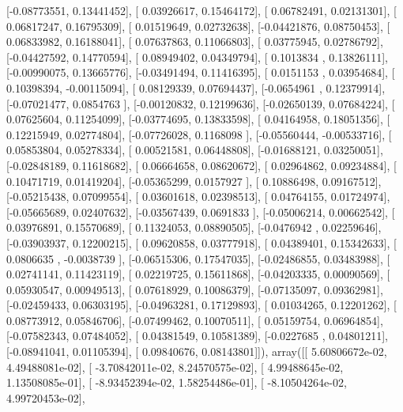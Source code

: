 \documentclass{article}
\begin{document}
       [-0.08773551,  0.13441452],
       [ 0.03926617,  0.15464172],
       [ 0.06782491,  0.02131301],
       [ 0.06817247,  0.16795309],
       [ 0.01519649,  0.02732638],
       [-0.04421876,  0.08750453],
       [ 0.06833982,  0.16188041],
       [ 0.07637863,  0.11066803],
       [ 0.03775945,  0.02786792],
       [-0.04427592,  0.14770594],
       [ 0.08949402,  0.04349794],
       [ 0.1013834 ,  0.13826111],
       [-0.00990075,  0.13665776],
       [-0.03491494,  0.11416395],
       [ 0.0151153 ,  0.03954684],
       [ 0.10398394, -0.00115094],
       [ 0.08129339,  0.07694437],
       [-0.0654961 ,  0.12379914],
       [-0.07021477,  0.0854763 ],
       [-0.00120832,  0.12199636],
       [-0.02650139,  0.07684224],
       [ 0.07625604,  0.11254099],
       [-0.03774695,  0.13833598],
       [ 0.04164958,  0.18051356],
       [ 0.12215949,  0.02774804],
       [-0.07726028,  0.1168098 ],
       [-0.05560444, -0.00533716],
       [ 0.05853804,  0.05278334],
       [ 0.00521581,  0.06448808],
       [-0.01688121,  0.03250051],
       [-0.02848189,  0.11618682],
       [ 0.06664658,  0.08620672],
       [ 0.02964862,  0.09234884],
       [ 0.10471719,  0.01419204],
       [-0.05365299,  0.0157927 ],
       [ 0.10886498,  0.09167512],
       [-0.05215438,  0.07099554],
       [ 0.03601618,  0.02398513],
       [ 0.04764155,  0.01724974],
       [-0.05665689,  0.02407632],
       [-0.03567439,  0.0691833 ],
       [-0.05006214,  0.00662542],
       [ 0.03976891,  0.15570689],
       [ 0.11324053,  0.08890505],
       [-0.0476942 ,  0.02259646],
       [-0.03903937,  0.12200215],
       [ 0.09620858,  0.03777918],
       [ 0.04389401,  0.15342633],
       [ 0.0806635 , -0.0038739 ],
       [-0.06515306,  0.17547035],
       [-0.02486855,  0.03483988],
       [ 0.02741141,  0.11423119],
       [ 0.02219725,  0.15611868],
       [-0.04203335,  0.00090569],
       [ 0.05930547,  0.00949513],
       [ 0.07618929,  0.10086379],
       [-0.07135097,  0.09362981],
       [-0.02459433,  0.06303195],
       [-0.04963281,  0.17129893],
       [ 0.01034265,  0.12201262],
       [ 0.08773912,  0.05846706],
       [-0.07499462,  0.10070511],
       [ 0.05159754,  0.06964854],
       [-0.07582343,  0.07484052],
       [ 0.04381549,  0.10581389],
       [-0.0227685 ,  0.04801211],
       [-0.08941041,  0.01105394],
       [ 0.09840676,  0.08143801]]), array([[  5.60806672e-02,   4.49488081e-02],
       [ -3.70842011e-02,   8.24570575e-02],
       [  4.99488645e-02,   1.13508085e-01],
       [ -8.93452394e-02,   1.58254486e-01],
       [ -8.10504264e-02,   4.99720453e-02],
\end{document}
